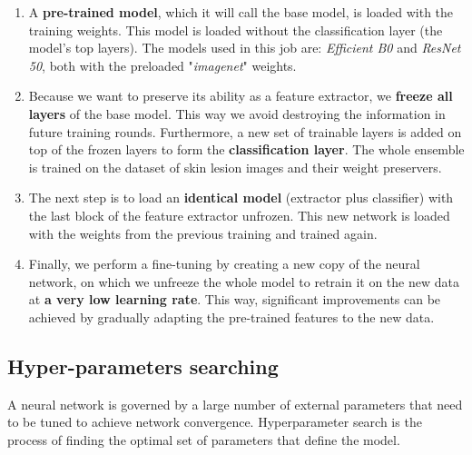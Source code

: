\begin{enumerate}
    \item A\textbf{ pre-trained model}, which it will call the base model, is loaded with the training weights. This model is loaded without the classification layer (the model's top layers). The models used in this job are: \textit{Efficient B0} and \textit{ResNet 50}, both with the preloaded "\textit{imagenet}" weights. 
 
    \item Because we want to preserve its ability as a feature extractor, we \textbf{freeze all layers} of the base model.  This way we avoid destroying the information in future training rounds. Furthermore, a new set of trainable layers is added on top of the frozen layers to form the \textbf{classification layer}. The whole ensemble is trained on the dataset of skin lesion images and their weight preservers. 

    \item The next step is to load an \textbf{identical model} (extractor plus classifier) with the last block of the feature extractor unfrozen. This new network is loaded with the weights from the previous training and trained again.

    \item Finally, we perform a fine-tuning by creating a new copy of the neural network, on which we unfreeze the whole model to retrain it on the new data at \textbf{a very low learning rate}. This way, significant improvements can be achieved by gradually adapting the pre-trained features to the new data.

\end{enumerate}



\subsection{Hyper-parameters searching}

A neural network is governed by a large number of external parameters that need to be tuned to achieve network convergence.  Hyperparameter search is the process of finding the optimal set of parameters that define the model.

